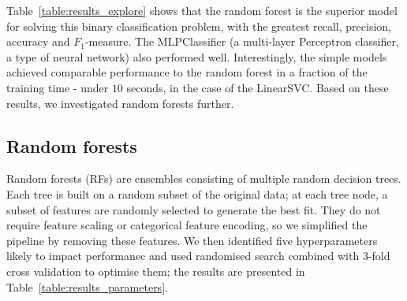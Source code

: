\documentclass[12pt,a4paper]{article}
\begin{document}
Table~\ref{table:results_explore} shows that the random forest is the superior model for solving this binary classification problem, with the greatest recall, precision, accuracy and $F_1$-measure. The MLPClassifier (a multi-layer Perceptron classifier, a type of neural network) also performed well. Interestingly, the simple models achieved comparable performance to the random forest in a fraction of the training time - under $10$ seconds, in the case of the LinearSVC.  Based on these results, we investigated random forests further.

\subsection{Random forests}

Random forests (RFs) are ensembles consisting of multiple random decision trees. Each tree is built on a random subset of the original data; at each tree node, a subset of features are randomly selected to generate the best fit. They do not require feature scaling or categorical feature encoding, so we simplified the pipeline by removing these features. We then identified five hyperparameters likely to impact performanec and used randomised search combined with $3$-fold cross validation to optimise them; the results are presented in Table~\ref{table:results_parameters}.
\end{document}
